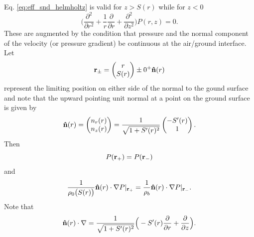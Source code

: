 Eq. \ref{eq:eff_snd_helmholtz} is valid for $z>S(r)$ while for $z<0$
\[
\Big(
\frac{\partial^2}{\partial r^2}+\frac{1}{r}\frac{\partial}{\partial r}
+
\frac{\partial^2}{\partial z^2}
\Big)P(r,z)=0.
\]
These are augmented by the condition that pressure and the normal component of the velocity (or pressure gradient) be continuous at the air/ground interface. Let 
\[
{\bf r}_\pm=\begin{pmatrix}r\\S(r)\\ \end{pmatrix}\pm 0^+ {\bf \hat n}(r)
\]
represent the limiting position on either side of the normal to the gound surface and note that the upward pointing unit normal at a point on the ground surface is given by 
\[
{\bf \hat n}(r)=\begin{pmatrix}n_r(r)\\n_z(r)\\\end{pmatrix}
=\frac{1}{\sqrt{1+S^\prime(r)^2}}\begin{pmatrix}-S^\prime(r)\\ 1\\\end{pmatrix}.
\]
Then
\begin{equation}\label{eq:P_cont_topo}
P({\bf r}_+)=P({\bf r}_-)
\end{equation}
and
\begin{equation}\label{eq:v_cont_topo}
\frac{1}{\rho_0\big(S(r)\big)}{\bf \hat n}(r)\cdot\nabla P|_{{\bf r}_+}
=
\frac{1}{\rho_b}{\bf \hat n}(r)\cdot\nabla P|_{{\bf r}_-}.
\end{equation}
Note that 
\[
{\bf \hat n}(r)\cdot\nabla
=
\frac{1}{\sqrt{1+S^\prime(r)^2}}
\Big(-S^\prime(r)\frac{\partial}{\partial r}+\frac{\partial}{\partial z}\Big).
\]
 
